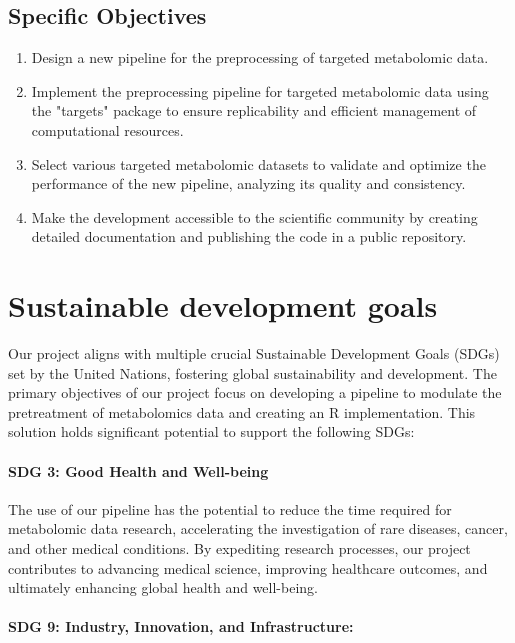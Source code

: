 \documentclass[ENG, BIB]{TFUOC}%
\begin{document}
\section{Specific Objectives}

\begin{enumerate}
    \item Design a new pipeline for the preprocessing of targeted metabolomic data.
    \item Implement the preprocessing pipeline for targeted metabolomic data using the "targets" package to ensure replicability and efficient management of computational resources.
    \item Select various targeted metabolomic datasets to validate and optimize the performance of the new pipeline, analyzing its quality and consistency.
    \item Make the development accessible to the scientific community by creating detailed documentation and publishing the code in a public repository.
\end{enumerate}


\chapter{Sustainable development goals}
\label{s:etic}

Our project aligns with multiple crucial Sustainable Development Goals (SDGs) set by the United Nations, fostering global sustainability and development. The primary objectives of our project focus on developing a pipeline to modulate the pretreatment of metabolomics data and creating an R implementation. This solution holds significant potential to support the following SDGs:

\subsubsection{SDG 3: Good Health and Well-being}

The use of our pipeline has the potential to reduce the time required for metabolomic data research, accelerating the investigation of rare diseases, cancer, and other medical conditions. By expediting research processes, our project contributes to advancing medical science, improving healthcare outcomes, and ultimately enhancing global health and well-being.

\subsubsection{SDG 9: Industry, Innovation, and Infrastructure:}
\end{document}
